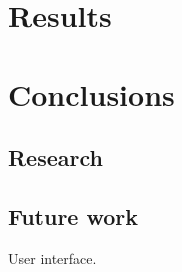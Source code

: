 \documentclass[a4paper,10pt]{article}
\begin{document}
\newpage
\section{Results}
\subsection{}


\subsection{}


\subsection{}


\newpage
\section{Conclusions}
\subsection{Research}


\subsection{}


\subsection{Future work}
User interface.


\newpage

\end{document}

